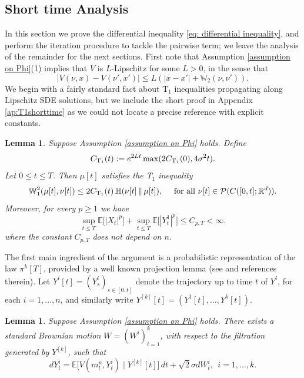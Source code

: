 \documentclass[11pt,reqno]{amsart}
\numberwithin{equation}{section}
\newtheorem{lemma}[theorem]{Lemma}
\theoremstyle{definition}
\def\E{{\mathbb E}}
\def\R{{\mathbb R}}
\newcommand{\W}{\mathbb W}
\newcommand{\ent}{ \mathbb H}
\begin{document}
\subsection{Short time Analysis}
In this section we prove the differential inequality \ref{eq: differential inequality}, and perform the iteration procedure to tackle the pairwise term; we leave the analysis of the remainder for the next sections. First note that Assumption \ref{assumption on Phi}(1) implies that $V$ is $L$-Lipschitz for some $L>0$, in the sense that
\[
|V(\nu,x)-V(\nu',x')| \le L(|x-x'| + \W_2(\nu,\nu')).
\]
We begin with a fairly standard fact about T$_1$ inequalities propagating along Lipschitz SDE solutions, but we include the short proof in Appendix \ref{ap:T1shorttime} as we could not locate a precise reference with explicit constants.

 
\begin{lemma} \label{lm: T1 short time}
Suppose Assumption \ref{assumption on Phi} holds. Define
\[
C_{\textup{T}_1}(t) := e^{2Lt}\max(2C_{\textup{T}_1}(0),4\sigma^2 t).
\]
Let $0 \le t \le T$. Then $\mu[t]$ satisfies the T$_1$ inequality
\[
\W_1^2(\mu[t],\nu[t])\leq 2C_{\textup{T}_1}(t) \,\ent (\nu[t]\,\|\,\mu[t]), \quad \text{ for all } \nu[t] \in \mathcal P(C([0,t];\R^d)).
\]
Moreover, for every $p\geq 1$ we have 
\[
\sup_{t \le T}\E\big[|X_t|^p\big]+\sup_{t \le T}\E\big[|Y^1_t|^p\big] \leq C_{p,T} < \infty.
\]
where the constant $C_{p,T}$ does not depend on $n$.
\end{lemma}






The first main ingredient of the argument is a probabilistic representation of the law $\pi^k[T]$, provided by a well known projection lemma (see \cite[Lemma 4.1]{HierarchiesPaper} and references therein).
Let $Y^i[t]=(Y^i_s)_{s \in [0,t]}$ denote the trajectory up to time $t$ of $Y^i$, for each $i=1,\ldots,n$, and similarly write $Y^{[k]}[t]=(Y^1[t],\dots,Y^k[t])$.

\begin{lemma}
\label{lm: projection path space}
Suppose Assumption \ref{assumption on Phi} holds.
There exists a standard Brownian motion $W=(W^i)_{i=1}^k$, with respect to the filtration generated by $Y^{[k]}$, such that
\begin{equation}
    dY_t^i =  \E\big[ V(m_t^n,Y_t^i)\mid Y^{[k]}[t]\big]\,dt+\sqrt2 \sigma dW^i_t , \ \    i=1,\dots,k. \label{eq:projectionSDE}
\end{equation}
\end{lemma}
\end{document}
